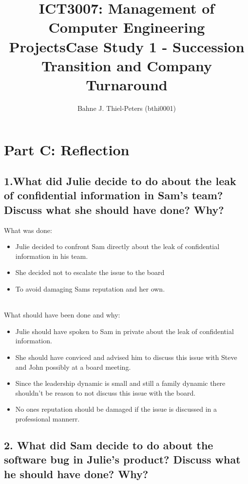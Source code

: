 \documentclass[a4paper,10pt]{article}
\title{ICT3007: Management of Computer Engineering Projects\newline \centering Case Study 1 - Succession Transition and Company Turnaround}
\author{
Bahne J. Thiel-Peters (bthi0001)
}
\begin{document}
\maketitle
\thispagestyle{empty}

\setcounter{page}{1}

\section{Part C: Reflection}
\subsection{1.What did Julie decide to do about the leak of confidential information in Sam’s team? Discuss what she should have done? Why?}

What was done:
\begin{itemize}
    \item Julie decided to confront Sam directly about the leak of confidential information in his team.
    \item She decided not to escalate the issue to the board
    \item To avoid damaging Sams reputation and her own.
\end{itemize}
\\
What should have been done and why:
\begin{itemize}
    \item Julie should have spoken to Sam in private about the leak of confidential information.
    \item She should have conviced and advised him to discuss this issue with Steve and John possibly at a board meeting.
    \item Since the leadership dynamic is small and still a family dynamic there shouldn't be reason to not discuss this issue with the board. 
    \item No ones reputation should be damaged if the issue is discussed in a professional mannerr.
\end{itemize}

\subsection{2. What did Sam decide to do about the software bug in Julie’s product? Discuss what he should have done? Why?}
\end{document}
